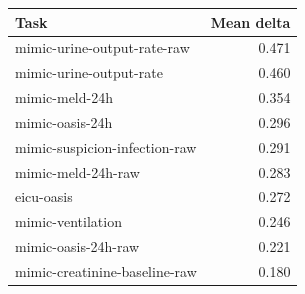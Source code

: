 \begin{tabular}{lr}
\toprule
Task & Mean delta \\
\midrule
mimic-urine-output-rate-raw & 0.471 \\
mimic-urine-output-rate & 0.460 \\
mimic-meld-24h & 0.354 \\
mimic-oasis-24h & 0.296 \\
mimic-suspicion-infection-raw & 0.291 \\
mimic-meld-24h-raw & 0.283 \\
eicu-oasis & 0.272 \\
mimic-ventilation & 0.246 \\
mimic-oasis-24h-raw & 0.221 \\
mimic-creatinine-baseline-raw & 0.180 \\
\bottomrule
\end{tabular}
